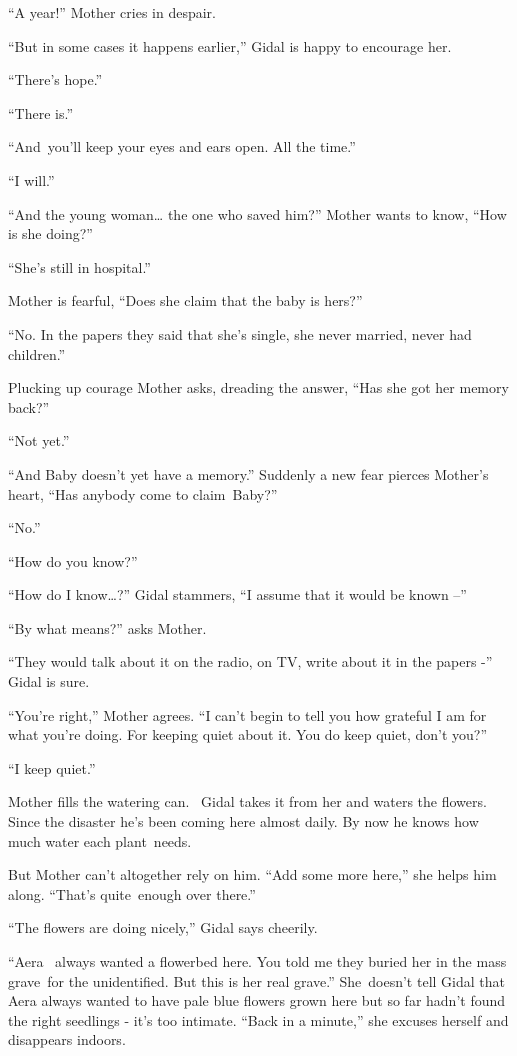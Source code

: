 \documentclass[twoside,11pt]{book}
\begin{document}
``A year!'' Mother cries in despair.

``But in some cases it happens earlier,'' Gidal is happy to encourage her.

``There's hope.''

``There is.''

``And~you'll keep your eyes and ears open. All the time.''

``I will.''

``And the young woman{\dots} the one who saved him?'' Mother wants to know, ``How
is she doing?''

``She's still in hospital.''

Mother is fearful, ``Does she claim{ }that the baby is hers?''

``No. In the papers they said that she's single, she never married, never had children.''

Plucking up courage Mother asks, dreading the answer, ``Has she got her memory back?''

``Not yet.''

``And Baby doesn't yet have a memory.'' Suddenly a new fear pierces Mother's heart,
``Has anybody come to claim~Baby?''

``No.''

``How do you know?''

``How do I know{\dots}?'' Gidal stammers, ``I assume that it would be known
--''

``By what means?'' asks Mother.

``They would talk about it on the radio, on TV, write about it in the papers -'' Gidal is
sure.

``You're right,'' Mother agrees. ``I can't begin to tell you how grateful I am
for what you're doing. For keeping quiet about it. You do keep quiet, don't you?''

``I keep quiet.''

Mother fills the watering can. ~Gidal takes it from her and waters the flowers. Since the disaster he's been coming here
almost daily. By now he knows how much water each plant~needs.

But Mother can't altogether rely on him. ``Add some more here,'' she helps him along.
``That's quite~enough over there.''

``The flowers are doing nicely,'' Gidal says cheerily.

``Aera~ always wanted a flowerbed here. You told me they buried her in the mass grave~for the unidentified.
But this is her real grave.'' She~doesn't tell Gidal that Aera always wanted to have pale blue flowers
grown here but so far hadn't found the right seedlings - it's too intimate. ``Back in a
minute,'' she excuses herself and disappears indoors.
\end{document}
